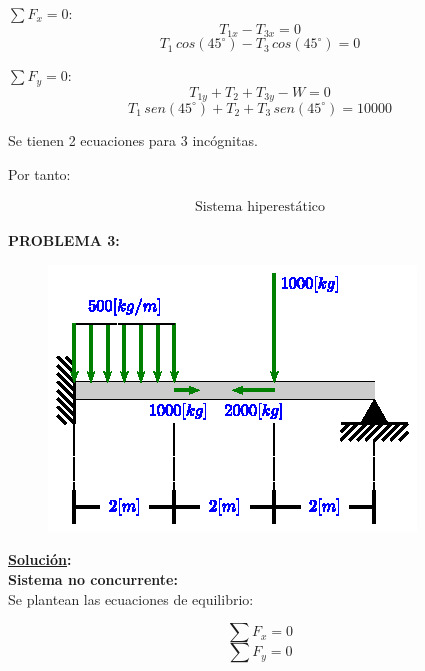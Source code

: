 \documentclass[letter,10pt,twoside]{article}
\begin{document}
$\sum{F_x} = 0$:
\begin{equation*}
    T_{1x} - T_{3x} = 0
\end{equation*}
\begin{equation*}
    T_1\,cos(45^\circ) - T_3\,cos(45^\circ) = 0
\end{equation*}

$\sum{F_y} = 0$:
\begin{equation*}
    T_{1y} + T_2 + T_{3y} - W = 0
\end{equation*}
\begin{equation*}
    T_1\,sen(45^\circ) + T_2 + T_3\,sen(45^\circ) = 10000
\end{equation*}

Se tienen 2 ecuaciones para 3 incógnitas.

Por tanto:

\begin{equation*}
\boxed{
    \begin{array}{l}
        \text{Sistema hiperestático}
    \end{array}
}
\end{equation*}

\vspace{1.0cm}

\colorbox{blue!25}{\textbf{PROBLEMA 3:}}

\begin{figure}[H]
\centering
\includegraphics[scale=1.8]{resources/f03.eps}
\end{figure}

\textbf{\underline{Solución}:} \\

\textbf{Sistema no concurrente:} \\
Se plantean las ecuaciones de equilibrio:

\begin{equation*}
    \sum{F_x} = 0
\end{equation*}
\begin{equation*}
    \sum{F_y} = 0
\end{equation*}
\end{document}
